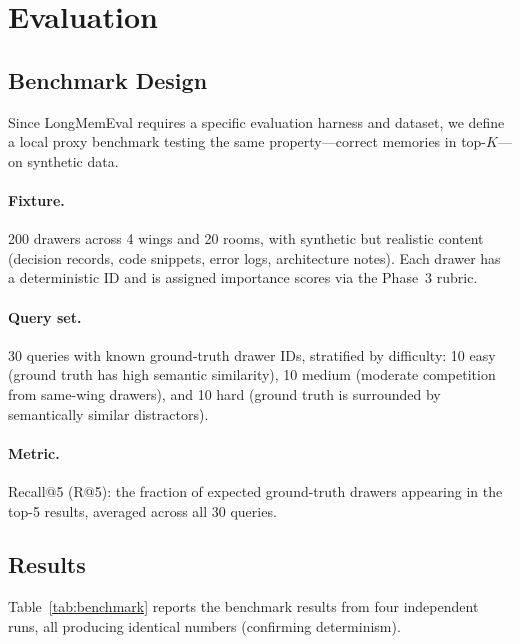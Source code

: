 \documentclass[11pt]{article}
\begin{document}
\section{Evaluation}

\subsection{Benchmark Design}

Since LongMemEval requires a specific evaluation harness and dataset, we
define a local proxy benchmark testing the same property---correct
memories in top-$K$---on synthetic data.

\paragraph{Fixture.}
200 drawers across 4 wings and 20 rooms, with synthetic but realistic
content (decision records, code snippets, error logs, architecture
notes). Each drawer has a deterministic ID and is assigned importance
scores via the Phase~3 rubric.

\paragraph{Query set.}
30 queries with known ground-truth drawer IDs, stratified by difficulty:
10 easy (ground truth has high semantic similarity), 10 medium (moderate
competition from same-wing drawers), and 10 hard (ground truth is
surrounded by semantically similar distractors).

\paragraph{Metric.}
Recall@5 (R@5): the fraction of expected ground-truth drawers appearing
in the top-5 results, averaged across all 30 queries.

\subsection{Results}

Table~\ref{tab:benchmark} reports the benchmark results from four
independent runs, all producing identical numbers (confirming
determinism).
\end{document}
